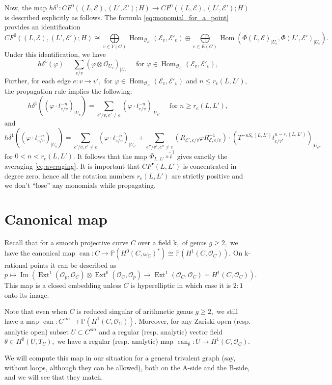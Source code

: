 \documentclass[11pt,leqno]{amsart}
\numberwithin{equation}{section}
\def\PP{{\mathbb P}}
\def\Hom{\operatorname{Hom}}
\newcommand{\can}{\operatorname{can}}
\newcommand{\mk}{\mathrm k}
\newcommand{\cO}{{\mathcal O}}
\newcommand{\cE}{{\mathcal E}}
\newcommand{\im}{\operatorname{Im}}
\newcommand{\Ext}{\operatorname{Ext}}
\begin{document}
Now, the map $h\delta^1:CF^0((L,\cE),(L',\cE');H)\to CF^0((L,\cE),(L',\cE');H)$ is described explicitly as follows. The formula \eqref{eq:monomial_for_a_point} provides an identification $$CF^0((L,\cE),(L',\cE');H)\cong \bigoplus\limits_{v\in V(G)}\Hom_{\cO_K}(\cE_v,\cE'_v)\oplus \bigoplus\limits_{e\in E(G)}\Hom(\Phi(L,\cE)_{\mid U_e},\Phi(L',\cE')_{\mid U_e}).$$ Under this identification, we have
$$h\delta^1(\varphi)=\sum\limits_{e/v}(\varphi\otimes\cO_{U_v})_{\mid U_e}\quad\text{ for }\varphi\in \Hom_{\cO_K}(\cE_v,\cE'_v),$$
Further, for each edge $e:v\to v',$ for $\varphi\in\Hom_{\cO_K}(\cE_v,\cE'_v)$ and $n\leq r_e(L,L'),$ the propagation rule implies the following: $$h\delta^1((\varphi\cdot t_{e/v}^{-n})_{\mid U_e})=\sum\limits_{e'/v,e'\ne e}(\varphi\cdot t_{e/v}^{-n})_{\mid U_{e'}}\quad\text{ for }n\geq r_e(L,L'),$$
and
$$h\delta^1((\varphi\cdot t_{e/v}^{-n})_{\mid U_e})=\sum\limits_{e'/v,e'\ne e}(\varphi\cdot t_{e/v}^{-n})_{\mid U_{e'}}+\sum\limits_{e''/v',e''\ne e} (R_{\cE',e/v}\varphi R_{\cE,e/v}^{-1})\cdot (T^{-nS_e(L,L')}t_{e/v'}^{n-r_e(L,L')})_{\mid U_{e''}}$$ for $0< n< r_e(L,L').$ It follows that the map $\Phi_{L,L'}\circ\tilde{i}^1$  gives exactly the averaging  \eqref{eq:averaging}. It is important that $CF^{\bullet}(L,L')$ is concentrated in degree zero, hence all the rotation numbers $r_e(L,L')$ are strictly positive and we don't
``lose'' any monomials while propagating.

\section{Canonical map} \label{s:canonicalmap}

Recall that for a smooth projective curve $C$ over a field $\mk,$ of genus $g\geq 2,$ we have the canonical map $\can:C\to \PP(H^0(C,\omega_C)^*)\cong \PP(H^1(C,\cO_C)).$ On $\mk$-rational points it can be described as
$$p\mapsto \im(\Ext^1(\cO_p,\cO_C)\otimes\Ext^0(\cO_C,\cO_p)\to \Ext^1(\cO_C,\cO_C)=H^1(C,\cO_C)).$$ This map is a closed embedding unless $C$ is hyperelliptic in which case it is $2:1$ onto its image.

Note that even when $C$ is reduced singular of arithmetic genus $g\geq 2,$ we still have a map $\can:C^{sm}\to \PP(H^1(C,\cO_C)).$ Moreover, for any Zariski open (resp. analytic open) subset $U\subset C^{sm}$ and a regular (resp. analytic) vector field $\theta\in H^0(U,T_U),$ we have a regular (resp. analytic) map $\can_{\theta}:U\to H^1(C,\cO_C).$

We will compute this map in our situation for a general trivalent graph (say, without loops, although they can be allowed), both on the A-side and the B-side, and we will see that they match.
\end{document}
